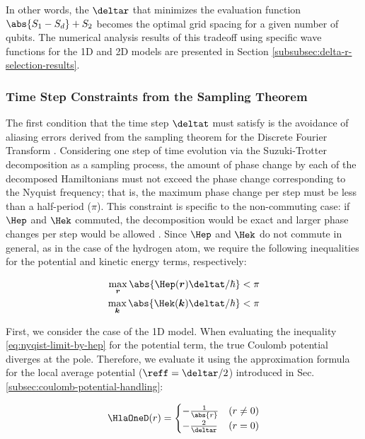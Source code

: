 \documentclass[manuscript_main.tex]{subfiles}
\begin{document}
In other words, the $\deltar$ that minimizes the evaluation function $\abs{S_1 -
S_d} + S_2$ becomes the optimal grid spacing for a given number of qubits. The
numerical analysis results of this tradeoff using specific wave functions for
the 1D and 2D models are presented in Section
\ref{subsubsec:delta-r-selection-results}.

\subsubsection{Time Step Constraints from the Sampling Theorem}

\label{subsubsec:time-step-constraints-from-sampling-theorem}

The first condition that the time step $\deltat$ must satisfy is the avoidance
of aliasing errors derived from the sampling theorem for the Discrete Fourier
Transform \cite{FEIT1982412}. Considering one step of time evolution via the
Suzuki-Trotter decomposition as a sampling process, the amount of phase change
by each of the decomposed Hamiltonians must not exceed the phase change
corresponding to the Nyquist frequency; that is, the maximum phase change per
step must be less than a half-period ($\pi$). This constraint is specific to the
non-commuting case: if $\Hep$ and $\Hek$ commuted, the decomposition would be
exact and larger phase changes per step would be allowed \cite{Kosloff1988}.
Since $\Hep$ and $\Hek$ do not commute in general, as in the case of the
hydrogen atom, we require the following inequalities for the potential and
kinetic energy terms, respectively:

\begin{align}
\max_{\bm{r}}\abs{\Hep(\bm{r})\deltat/\hbar} < \pi \label{eq:nyqist-limit-by-hep}\\
\max_{\bm{k}}\abs{\Hek(\bm{k})\deltat/\hbar} < \pi \label{eq:nyqist-limit-by-hek}
\end{align}

First, we consider the case of the 1D model. When evaluating the inequality
\eqref{eq:nyqist-limit-by-hep} for the potential term, the true Coulomb
potential diverges at the pole. Therefore, we evaluate it using the
approximation formula for the local average potential ($\reff=\deltar/2$)
introduced in Sec. \ref{subsec:coulomb-potential-handling}:

\begin{equation}
\HlaOneD(r) = \begin{cases}
-\frac{1}{\abs{r}} & (r\neq0) \\
-\frac{2}{\deltar} & (r=0)
\end{cases}
\end{equation}
\end{document}
